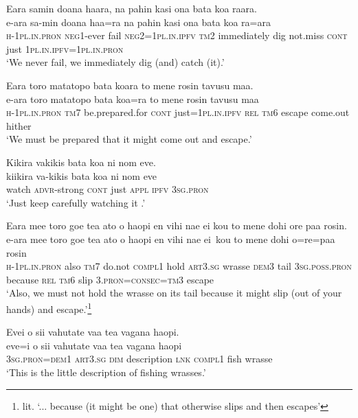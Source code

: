 \ea\label{ex:text28-16}
Eara samin doana haara, na pahin kasi ona bata koa raara.\\
\gll e-ara	sa-min	doana	haa=ra	na	pahin	kasi	ona	bata	koa	ra=ara\\
     \textsc{h}-1\textsc{pl}.\textsc{in}.\textsc{pron}	\textsc{neg}1-ever	fail	\textsc{neg}2=1\textsc{pl}.\textsc{in}.\textsc{ipfv}	\textsc{tm}2	immediately	dig	not.miss	\textsc{cont}	just	1\textsc{pl}.\textsc{in}.\textsc{ipfv}=1\textsc{pl}.\textsc{in}.\textsc{pron}\\
\glt `We never fail, we immediately dig (and) catch (it).'
\z

\ea\label{ex:text28-17}
Eara toro matatopo bata koara to mene rosin tavusu maa.\\
\gll e-ara	toro	matatopo	bata	koa=ra	to	mene	rosin	tavusu	maa\\
     \textsc{h}-1\textsc{pl}.\textsc{in}.\textsc{pron}	\textsc{tm}7	be.prepared.for	\textsc{cont}	just=1\textsc{pl}.\textsc{in}.\textsc{ipfv}	\textsc{rel}	\textsc{tm}6	escape	come.out	hither\\
\glt `We must be prepared that it might come out and escape.'
\z

\ea\label{ex:text28-18}
Kikira vakikis bata koa ni nom eve.\\
\gll kiikira	va-kikis	bata	koa	ni	nom	eve\\
     watch	\textsc{advr}-strong	\textsc{cont}	just	\textsc{appl}	\textsc{ipfv}	3\textsc{sg}.\textsc{pron}\\
\glt `Just keep carefully watching it .'
\z

\ea\label{ex:text28-19}
Eara mee toro goe tea ato o haopi en vihi nae ei kou to mene dohi ore paa rosin.\\
\gll e-ara	mee	toro	goe	tea	ato	o	haopi	en	vihi	nae	ei~kou	to	mene	dohi	o=re=paa	rosin\\
     \textsc{h}-1\textsc{pl}.\textsc{in}.\textsc{pron}	also	\textsc{tm}7	do.not	\textsc{compl}1	hold	\textsc{art}3.\textsc{sg}	wrasse	\textsc{dem}3	tail	3\textsc{sg}.\textsc{poss}.\textsc{pron}	because	\textsc{rel}	\textsc{tm}6	slip	3.\textsc{pron}=\textsc{consec}=\textsc{tm}3	escape\\
\glt `Also, we must not hold the wrasse on its tail because it might slip (out of your hands) and escape.'\footnote{lit. `... because (it might be one) that otherwise slips and then escapes'}
\z

\ea\label{ex:text28-20}
Evei o sii vahutate vaa tea vagana haopi.\\
\gll eve=i	o	sii	vahutate	vaa	tea	vagana	haopi\\
     3\textsc{sg}.\textsc{pron}=\textsc{dem}1	\textsc{art}3.\textsc{sg}	\textsc{dim}	description	\textsc{lnk}	\textsc{compl}1	fish	wrasse\\
\glt `This is the little description of fishing wrasses.'
\z
